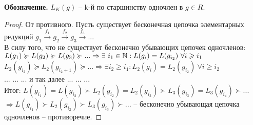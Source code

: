 \textbf{Обозначение.} $L_K(g)$ -- k-й по старшинству одночлен в $g\in R$.\\
\begin{proof}
    От противного. Пусть существует бесконечная цепочка элементарных редукций $g_1\overset{f_1}{\rightarrow}g_2\overset{f_2}{\rightarrow}g_3\overset{f_3}{\rightarrow}...$\\
    В силу того, что не существует бесконечно убывающих цепочек одночленов:\\
    $L(g_1)\succcurlyeq L(g_2)\succcurlyeq L(g_3)\succcurlyeq ...\Rightarrow \exists \ i_1\in \mathbb{N} : L(g_i)= L(g_{i_2})\ \forall i\geqslant i_1$\\
    $L_2(g_{i_2})\succcurlyeq L_2(g_{i_2+1})\succcurlyeq...\Rightarrow \exists i_2\geqslant i_1: L_2(g_i)=L_2(g_{i_2})\ \forall i\geqslant i_2$\\
    ... ... ... и так далее ... ... ...\\
    Итог: $L(g_{i_1})=L(g_{i_2})\succ L_2(g_{i_2})=L_2(g_{i_3})\succ L_3(g_{i_3})=L_3(g_{i_4})\succ...$\\
    $\Rightarrow L(g_{i_1})\succ L_2(g_{i_2})\succ L_3(g_{i_3})\succ...$ -- бесконечно убывающая цепочка одночленов -- противоречие.
\end{proof}